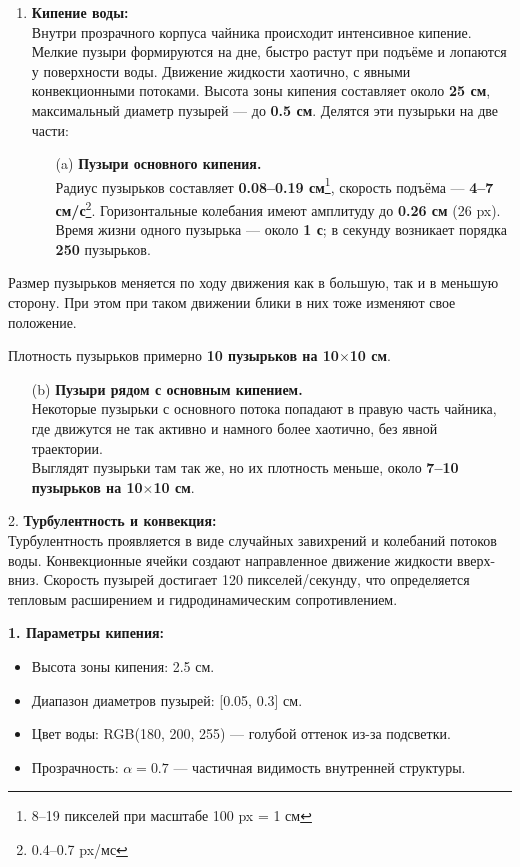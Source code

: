 \documentclass[areasetadvanced]{scrartcl}
\begin{document}
\begin{enumerate}
    \item \textbf{Кипение воды:}\\
    Внутри прозрачного корпуса чайника происходит интенсивное кипение. Мелкие пузыри формируются на дне, быстро растут при подъёме и лопаются у поверхности воды. Движение жидкости хаотично, с явными конвекционными потоками. Высота зоны кипения составляет около \textbf{25 см}, максимальный диаметр пузырей — до \textbf{0.5 см}. Делятся эти пузырьки на две части:
    \begin{enumerate}
        \item[(a)] \textbf{Пузыри основного кипения.}\\
        Радиус пузырьков составляет \textbf{0.08--0.19 см}\footnote{8–19 пикселей при масштабе 100 px = 1 см}, 
        скорость подъёма — \textbf{4–7 см/с}\footnote{0.4–0.7 px/мс}.  
        Горизонтальные колебания имеют амплитуду до \textbf{0.26 см} (26 px).  
        Время жизни одного пузырька — около \textbf{1 с}; в секунду возникает порядка \textbf{250} пузырьков.
    \end{enumerate}
    
\end{enumerate}
Размер пузырьков меняется по ходу движения как в большую, так и в меньшую сторону. При этом при таком движении блики в них тоже изменяют свое положение.

Плотность пузырьков примерно \textbf{10 пузырьков на 10$\times$10 см}.

\begin{enumerate}
    \setcounter{enumi}{0}
    \item[(b)] \textbf{Пузыри рядом с основным кипением.}\\
    Некоторые пузырьки с основного потока попадают в правую часть чайника, где движутся не так активно и намного более хаотично, без явной траектории.\\
    Выглядят пузырьки там так же, но их плотность меньше, около \textbf{7--10 пузырьков на 10$\times$10 см}.
\end{enumerate}

2. \textbf{Турбулентность и конвекция:}\\
Турбулентность проявляется в виде случайных завихрений и колебаний потоков воды. Конвекционные ячейки создают направленное движение жидкости вверх-вниз. Скорость пузырей достигает 120 пикселей/секунду, что определяется тепловым расширением и гидродинамическим сопротивлением.

\textbf{1. Параметры кипения:}
\begin{itemize}
    \item Высота зоны кипения: 2.5 см.
    \item Диапазон диаметров пузырей: [0.05, 0.3] см.
    \item Цвет воды: RGB(180, 200, 255) — голубой оттенок из-за подсветки.
    \item Прозрачность: $\alpha = 0.7$ — частичная видимость внутренней структуры.
\end{itemize}
\end{document}
